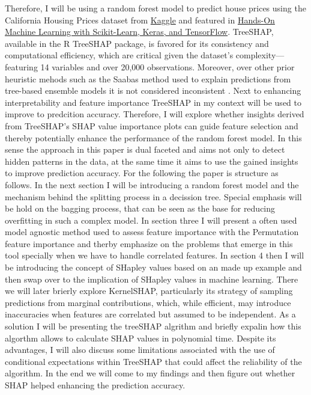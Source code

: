 \documentclass[12pt]{article}
\begin{document}
Therefore,  I will be using a random forest model to predict house prices using the California Housing Prices dataset from \href{https://www.kaggle.com/datasets/camnugent/california-housing-prices}{Kaggle} and featured in \href{https://www.oreilly.com/library/view/hands-on-machine-learning/9781492032632/}{Hands-On Machine Learning with Scikit-Learn, Keras, and TensorFlow}.
TreeSHAP, available in the R TreeSHAP package, is favored for its consistency and computational efficiency, which are critical given the dataset's complexity—featuring 14 variables and over 20,000 observations.
Moreover, over other prior heuristic mehods such as the Saabas method used to explain predictions from tree-based ensemble models it is not considered inconsistent \cite{lundberg2019consistent}.
Next to enhancing interpretability and feature importance TreeSHAP in my context will be used to improve to predcition accuracy.
Therefore, I will explore whether insights derived from TreeSHAP's SHAP value importance plots can guide feature selection and thereby potentially enhance the performance of the random forest model.
In this sense the approach in this paper is dual faceted and aims not only to detect hidden patterns in the data, at the same time it aims to use the gained insights to improve prediction accuracy. 
For the following the paper is structure as follows. In the next section I will be introducing a random forest model and the mechanism behind the splitting process in a decission tree.
Special emphasis will be hold on the bagging process, that can be seen as the base for reducing overfitting in such a complex model. In section three I will present a often used model agnostic method used to assess feature importance with the Permutation feature importance and therby emphasize on the problems that emerge in this tool specially when we have to handle correlated features.  In section 4 then I will be introducing the concept of SHapley values based on an made up example and then swap over to the implication of SHapley values in machine learning.
There we will later brierly explore KernelSHAP, particularly its strategy of sampling predictions from marginal contributions, which, while efficient, may introduce inaccuracies when features are correlated but assumed to be independent. As a solution I will be presenting the treeSHAP algrithm and briefly expalin how this algorthm allows to calculate SHAP values in polynomial time.
 Despite its advantages, I will also discuss some limitations associated with the use of conditional expectations within TreeSHAP that could affect the reliability of the algorithm. In the end we will come to my findings and then figure out whether SHAP helped enhancing the prediction accuracy.


	
	
	
	
	
	
	
	
	
	


\end{document}
